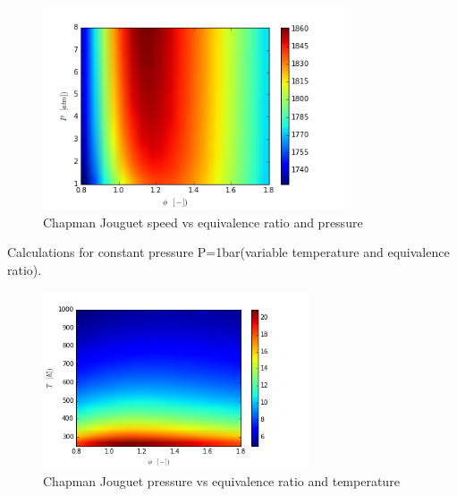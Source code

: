 \documentclass[11pt,a4paper]{article}
\begin{document}
\begin{figure}[b]
    \centering
    \includegraphics[width=0.8\textwidth]{CJ_V_phi_P_}
    \caption{Chapman Jouguet speed vs equivalence ratio and pressure}
    \label{fig:E}
\end{figure}
\clearpage
Calculations for constant pressure P=1bar(variable temperature and equivalence ratio).\\
\begin{figure}[h]
    \centering
    \includegraphics[width=0.7\textwidth]{CJ_P_phi_T_}
    \caption{Chapman Jouguet pressure vs equivalence ratio and temperature}
    \label{fig:F}
\end{figure}
\end{document}
